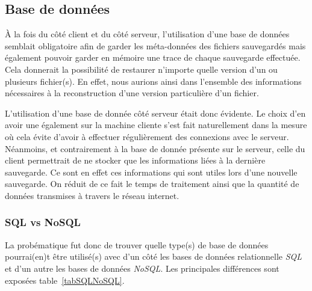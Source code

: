 \documentclass[a4paper,10pt, twoside]{report}
\begin{document}
\begin{spacing}{1.2}
\subsection{Base de donn\'ees}
\`A la fois du c\^ot\'e client et du c\^ot\'e serveur, l'utilisation d'une
base de donn\'ees semblait obligatoire afin de garder les m\'eta-donn\'ees
des fichiers sauvegard\'es mais \'egalement pouvoir garder en m\'emoire une
trace de chaque sauvegarde effectu\'ee. Cela donnerait la possibilit\'e
de restaurer n'importe quelle version d'un ou plusieurs fichier(s). En effet,
nous aurions ainsi dans l'ensemble des informations n\'ecessaires \`a la
reconstruction d'une version particuli\`ere d'un fichier.

L'utilisation d'une base de donn\'ee c\^ot\'e serveur \'etait donc \'evidente.
Le choix d'en avoir une \'egalement sur la machine cliente s'est fait
naturellement dans la mesure o\`u cela \'evite d'avoir \`a effectuer
r\'eguli\`erement des connexions avec le serveur. N\'eanmoins, et contrairement
\`a la base de donn\'ee pr\'esente sur le serveur, celle du client permettrait
de ne stocker que les informations li\'ees \`a la derni\`ere sauvegarde. Ce
sont en effet ces informations qui sont utiles lors d'une nouvelle sauvegarde.
On r\'eduit de ce fait le temps de traitement ainsi que la quantit\'e de
donn\'ees transmises \`a travers le r\'eseau internet.

\subsubsection{SQL vs NoSQL}
La prob\'ematique fut donc de trouver quelle type(s) de base de donn\'ees
pourrai(en)t \^etre utilis\'e(s) avec d'un c\^ot\'e les bases de donn\'ees
relationnelle \textit{SQL} et d'un autre les bases de donn\'ees \textit{NoSQL}.
Les principales diff\'erences sont expos\'ees table~\ref{tabSQLNoSQL}.


\end{spacing}
\end{document}
